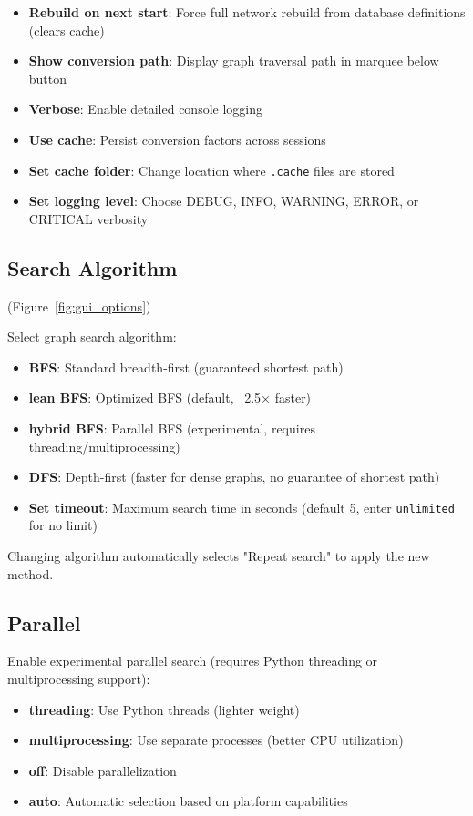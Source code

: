 \documentclass[11pt,a4paper]{report}
\begin{document}
\begin{itemize}
\item \textbf{Rebuild on next start}: Force full network rebuild from database definitions (clears cache)
\item \textbf{Show conversion path}: Display graph traversal path in marquee below button
\item \textbf{Verbose}: Enable detailed console logging
\item \textbf{Use cache}: Persist conversion factors across sessions
\item \textbf{Set cache folder}: Change location where \texttt{.cache} files are stored
\item \textbf{Set logging level}: Choose DEBUG, INFO, WARNING, ERROR, or CRITICAL verbosity
\end{itemize}

\subsection{Search Algorithm} (Figure~\ref{fig:gui_options})

Select graph search algorithm:

\begin{itemize}
\item \textbf{BFS}: Standard breadth-first (guaranteed shortest path)
\item \textbf{lean BFS}: Optimized BFS (default, ~2.5× faster)
\item \textbf{hybrid BFS}: Parallel BFS (experimental, requires threading/multiprocessing)
\item \textbf{DFS}: Depth-first (faster for dense graphs, no guarantee of shortest path)
\item \textbf{Set timeout}: Maximum search time in seconds (default 5, enter \texttt{unlimited} for no limit)
\end{itemize}

Changing algorithm automatically selects "Repeat search" to apply the new method.

\subsection{Parallel}

Enable experimental parallel search (requires Python threading or multiprocessing support):

\begin{itemize}
\item \textbf{threading}: Use Python threads (lighter weight)
\item \textbf{multiprocessing}: Use separate processes (better CPU utilization)
\item \textbf{off}: Disable parallelization
\item \textbf{auto}: Automatic selection based on platform capabilities
\end{itemize}
\end{document}
